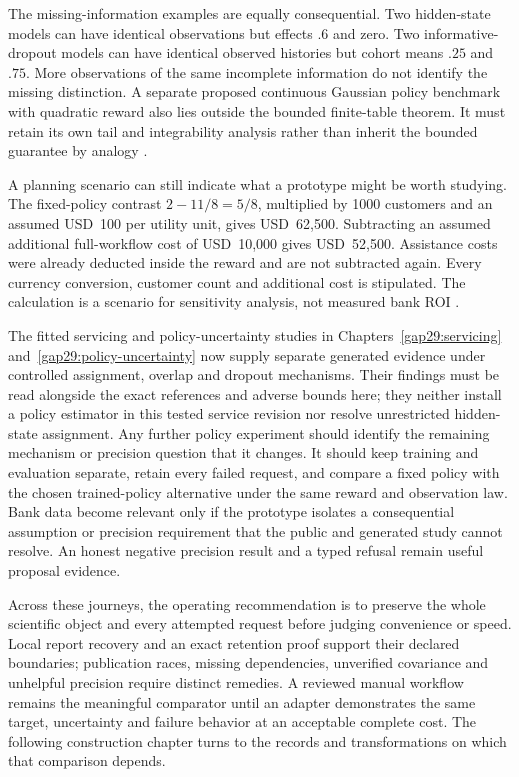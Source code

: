 The missing-information examples are equally consequential. Two hidden-state
models can have identical observations but effects $.6$ and zero. Two
informative-dropout models can have identical observed histories but cohort
means $.25$ and $.75$. More observations of the same incomplete information do
not identify the missing distinction. A separate proposed continuous Gaussian
policy benchmark with quadratic reward also lies outside the bounded
finite-table theorem. It must retain its own tail and integrability analysis
rather than inherit the bounded guarantee by analogy
\citep{exec14_servicing_evidence}.

A planning scenario can still indicate what a prototype might be worth studying.
The fixed-policy contrast $2-11/8=5/8$, multiplied by 1000 customers and an
assumed USD~100 per utility unit, gives USD~62,500. Subtracting an assumed
additional full-workflow cost of USD~10,000 gives USD~52,500. Assistance costs
were already deducted inside the reward and are not subtracted again. Every
currency conversion, customer count and additional cost is stipulated. The
calculation is a scenario for sensitivity analysis, not measured bank ROI
\citep{exec14_servicing_evidence}.

The fitted servicing and policy-uncertainty studies in Chapters~\ref{gap29:servicing} and~\ref{gap29:policy-uncertainty} now supply separate generated evidence under controlled assignment, overlap and dropout mechanisms. Their findings must be read alongside the exact references and adverse bounds here; they neither install a policy estimator in this tested service revision nor resolve unrestricted hidden-state assignment. Any further policy experiment should identify the remaining mechanism or precision question that it changes. It
should keep training and evaluation separate, retain every failed request, and
compare a fixed policy with the chosen trained-policy alternative under the same
reward and observation law. Bank data become relevant only if the prototype
isolates a consequential assumption or precision requirement that the public
and generated study cannot resolve. An honest negative precision result and a typed refusal remain useful proposal evidence.

Across these journeys, the operating recommendation is to preserve the whole scientific object and every attempted request before judging convenience or speed. Local report recovery and an exact retention proof support their declared boundaries; publication races, missing dependencies, unverified covariance and unhelpful precision require distinct remedies. A reviewed manual workflow remains the meaningful comparator until an adapter demonstrates the same target, uncertainty and failure behavior at an acceptable complete cost. The following construction chapter turns to the records and transformations on which that comparison depends.
